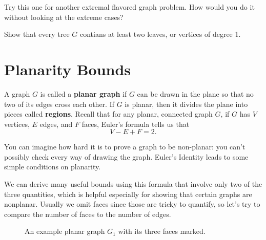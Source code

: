 \documentclass[11 pt]{scrartcl}
\begin{document}
Try this one for another extremal flavored graph problem. How would you do it without looking at the extreme cases?
\begin{exercise}
    Show that every tree $G$ contians at least two leaves, or vertices of degree 1. 
\end{exercise}


\iffalse

\section{Planarity Bounds}
A graph $G$ is called a \textbf{planar graph} if $G$ can be drawn in the plane so that no two of its edges cross each other. If $G$ is planar, then it divides the plane into pieces called \textbf{regions}. Recall that for any planar, connected graph $G$, if $G$ has $V$ vertices, $E$ edges, and $F$ faces, Euler's formula tells us that 
    \[ V-E+F = 2. \]

You can imagine how hard it is to prove a graph to be non-planar: you can't possibly check every way of drawing the graph. Euler's Identity leads to some simple conditions on planarity.

We can derive many useful bounds using this formula that involve only two of the three quantities, which is helpful especially for showing that certain graphs are nonplanar. Usually we omit faces since those are tricky to quantify, so let's try to compare the number of faces to the number of edges. 

\begin{figure}[!htb]
\begin{center}
\end{center}
\caption{An example planar graph $G_1$ with its three faces marked.}
\label{fig:graph}
\end{figure}
\end{document}
